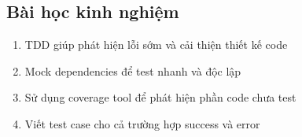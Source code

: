 \subsection{Bài học kinh nghiệm}
\begin{enumerate}
    \item TDD giúp phát hiện lỗi sớm và cải thiện thiết kế code
    \item Mock dependencies để test nhanh và độc lập
    \item Sử dụng coverage tool để phát hiện phần code chưa test
    \item Viết test case cho cả trường hợp success và error
\end{enumerate}
